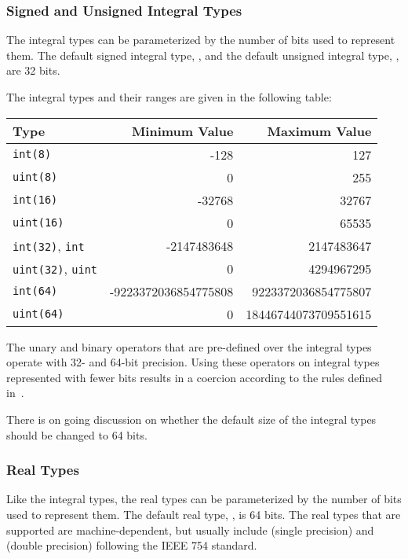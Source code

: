 \subsubsection{Signed and Unsigned Integral Types}
\label{Signed_and_Unsigned_Integral_Types}

The integral types can be parameterized by the number of bits used to
represent them.  The default signed integral type, , and the
default unsigned integral type, , are 32 bits.

The integral types and their ranges are given in the following table:

\begin{center}
\begin{tabular}{|l|r|r|}
\hline
{\bf Type} & {\bf Minimum Value} & {\bf Maximum Value} \\
\hline
{\tt int(8)} & -128 & 127 \\
{\tt uint(8)} & 0 & 255 \\
{\tt int(16)} & -32768 & 32767 \\
{\tt uint(16)} & 0 & 65535 \\
{\tt int(32)}, {\tt int} & -2147483648 & 2147483647 \\
{\tt uint(32)}, {\tt uint} & 0 & 4294967295 \\
{\tt int(64)} & -9223372036854775808 & 9223372036854775807 \\
{\tt uint(64)} & 0 & 18446744073709551615 \\
\hline
\end{tabular}
\end{center}

The unary and binary operators that are pre-defined over the integral
types operate with 32- and 64-bit precision.  Using these operators on
integral types represented with fewer bits results in a coercion
according to the rules defined in~.

\begin{openissue}
There is on going discussion on whether the default size of the
integral types should be changed to 64 bits.
\end{openissue}


\subsubsection{Real Types}
\label{Real_Types}

Like the integral types, the real types can be parameterized by the
number of bits used to represent them.  The default real
type, , is 64 bits.  The real types that are supported are
machine-dependent, but usually include  (single
precision) and  (double precision) following the IEEE
754 standard.

